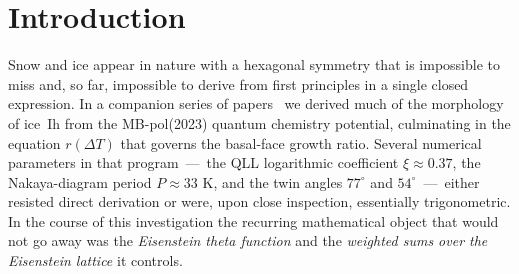\documentclass[11pt,letterpaper]{article}
\theoremstyle{plain}
\theoremstyle{definition}
\begin{document}
\begin{abstract}
\textbf{What this does to the framework.}  Nothing, as far as
predictions go.  Every numerical observation in Parts~I--II
survives, with the same residuals, under the cleaner framing.
What changes is the rhetoric: no more promises of modular-form
structure that do not cash out, no more mock-theta identifications
that require q-expansion matches we never performed.  The ice-rule
and the Eisenstein shell counts carry the load; theta functions
provide bookkeeping plus one asymptotic theorem.

\noindent\textbf{Keywords.} ice~Ih, Eisenstein lattice, ice rule,
Boltzmann average, equipartition, quasi-liquid layer, Bjerrum
defects, dendrite resonance, UNDERWOOD, snow crystals.

\noindent\textbf{Companion verification.}  Lean~4:
\texttt{SnowCrystalProofs.ThetaMean} (P1 proved; P4 flagged as
axiom), \texttt{SnowCrystalProofs.CrystalMathDerivations}
(algebraic lemmas).  Numerics:
\texttt{theta\_mean\_definition\_v1.py},
\texttt{thetamean\_paper\_generator\_v2.py},
\texttt{underwood\_qll\_sharpening\_v1.py}.
\end{abstract}

\tableofcontents

\bigskip

\section{Introduction}

Snow and ice appear in nature with a hexagonal symmetry that is
impossible to miss and, so far, impossible to derive from first
principles in a single closed expression.  In a companion series of
papers~\cite{MamounPaperIII,MamounPaperIV,MamounPaperV} we derived
much of the morphology of ice~Ih from the MB-pol(2023) quantum
chemistry potential, culminating in the equation $r(\Delta T)$ that
governs the basal-face growth ratio.  Several numerical parameters in
that program~---~the QLL logarithmic coefficient $\xi \approx 0.37$,
the Nakaya-diagram period $P \approx 33$ K, and the twin angles
$77^{\circ}$ and $54^{\circ}$~---~either resisted direct derivation
or were, upon close inspection, essentially trigonometric.  In the
course of this investigation the recurring mathematical object that
would not go away was the \emph{Eisenstein theta function} and the
\emph{weighted sums over the Eisenstein lattice} it controls.
\end{document}
